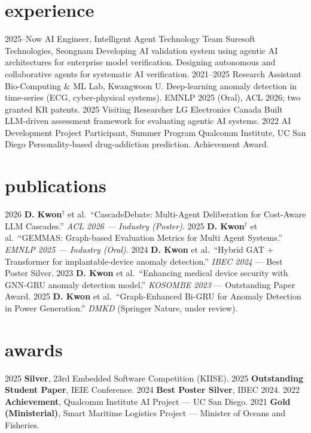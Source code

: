 \documentclass[]{twentysecondcv}
\begin{document}
\section{experience}
\begin{twenty}
  \twentyitem
    {2025--Now}
    {AI Engineer, Intelligent Agent Technology Team}
    {Suresoft Technologies, Seongnam}
    {Developing AI validation system using agentic AI architectures for enterprise model verification. Designing autonomous and collaborative agents for systematic AI verification. }
  \twentyitem
    {2021--2025}
    {Research Assistant}
    {Bio-Computing \& ML Lab, Kwangwoon U.}
    {Deep-learning anomaly detection in time-series (ECG, cyber-physical systems). EMNLP 2025 (Oral), ACL 2026; two granted KR patents. }
  \twentyitem
    {2025}
    {Visiting Researcher}
    {LG Electronics Canada}
    {Built LLM-driven assessment framework for evaluating agentic AI systems. }
  \twentyitem
    {2022}
    {AI Development Project Participant, Summer Program}
    {Qualcomm Institute, UC San Diego}
    {Personality-based drug-addiction prediction. Achievement Award. }
\end{twenty}

\section{publications}
\begin{twentyshort}
  \twentyitemshort
    {2026}
    {\textbf{D. Kwon}$^{\dagger}$ et al.\ ``CascadeDebate: Multi-Agent Deliberation for Cost-Aware LLM Cascades.'' \emph{ACL 2026 --- Industry (Poster)}.}
  \twentyitemshort
    {2025}
    {\textbf{D. Kwon}$^{\dagger}$ et al.\ ``GEMMAS: Graph-based Evaluation Metrics for Multi Agent Systems.'' \emph{EMNLP 2025 --- Industry (Oral)}.}
  \twentyitemshort
    {2024}
    {\textbf{D. Kwon} et al.\ ``Hybrid GAT + Transformer for implantable-device anomaly detection.'' \emph{IBEC 2024} --- Best Poster Silver.}
  \twentyitemshort
    {2023}
    {\textbf{D. Kwon} et al.\ ``Enhancing medical device security with GNN-GRU anomaly detection model.'' \emph{KOSOMBE 2023} --- Outstanding Paper Award.}
  \twentyitemshort
    {2025}
    {\textbf{D. Kwon} et al.\ ``Graph-Enhanced Bi-GRU for Anomaly Detection in Power Generation.'' \emph{DMKD } (Springer Nature, under review).}
\end{twentyshort}

\section{awards}
\begin{twentyshort}
  \twentyitemshort
    {2025}
    {\textbf{Silver}, 23rd Embedded Software Competition (KIISE).}
  \twentyitemshort
    {2025}
    {\textbf{Outstanding Student Paper}, IEIE Conference.}
  \twentyitemshort
    {2024}
    {\textbf{Best Poster  Silver}, IBEC 2024.}
  \twentyitemshort
    {2022}
    {\textbf{Achievement}, Qualcomm Institute AI Project --- UC San Diego.}
  \twentyitemshort
    {2021}
    {\textbf{Gold (Ministerial)}, Smart Maritime Logistics Project --- Minister of Oceans and Fisheries.}
\end{twentyshort}
\end{document}
